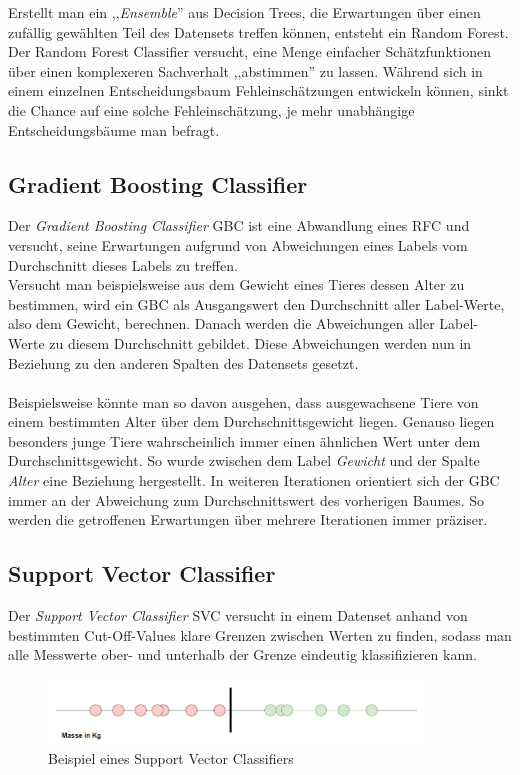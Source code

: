 Erstellt man ein ,,\textit{Ensemble}'' aus Decision Trees, die Erwartungen über einen zufällig gewählten 
Teil des Datensets treffen können, entsteht ein Random Forest.
Der Random Forest Classifier versucht, eine Menge einfacher Schätzfunktionen über einen komplexeren 
Sachverhalt ,,abstimmen'' zu lassen. Während sich in einem einzelnen Entscheidungsbaum Fehleinschätzungen 
entwickeln können, sinkt die Chance auf eine solche Fehleinschätzung, je mehr unabhängige 
Entscheidungsbäume man befragt. 

\subsection{Gradient Boosting Classifier}
Der \textit{Gradient Boosting Classifier} GBC ist eine Abwandlung eines RFC und  versucht, seine Erwartungen
aufgrund von Abweichungen eines Labels vom Durchschnitt dieses Labels zu treffen. \\
Versucht man beispielsweise aus dem Gewicht eines Tieres dessen Alter zu bestimmen, wird 
ein GBC als Ausgangswert den Durchschnitt aller Label-Werte, also dem Gewicht, berechnen. Danach werden die 
Abweichungen aller Label-Werte zu diesem Durchschnitt gebildet. Diese Abweichungen werden nun in Beziehung zu den 
anderen Spalten des Datensets gesetzt. 
\\\\
Beispielsweise könnte man so davon ausgehen, dass ausgewachsene Tiere von einem 
bestimmten Alter über dem Durchschnittsgewicht liegen. Genauso liegen besonders junge Tiere wahrscheinlich immer
einen ähnlichen Wert unter dem Durchschnittsgewicht. So wurde zwischen dem Label \textit{Gewicht} und der Spalte 
\textit{Alter} eine Beziehung hergestellt. In weiteren Iterationen orientiert sich der GBC immer an der Abweichung 
zum Durchschnittswert des vorherigen Baumes. So werden die getroffenen Erwartungen über mehrere Iterationen immer 
präziser.
\newpage
\subsection{Support Vector Classifier}
Der \textit{Support Vector Classifier} SVC versucht in einem Datenset anhand von bestimmten Cut-Off-Values klare Grenzen 
zwischen Werten zu finden, sodass man alle Messwerte ober- und unterhalb der Grenze eindeutig klassifizieren 
kann.

\begin{figure}[h]
    \centering
    \includegraphics[width=10.0cm]{pic/SVC_1D.png}
    \caption{Beispiel eines Support Vector Classifiers}
    \label{fig:SVC_1D}
\end{figure}

